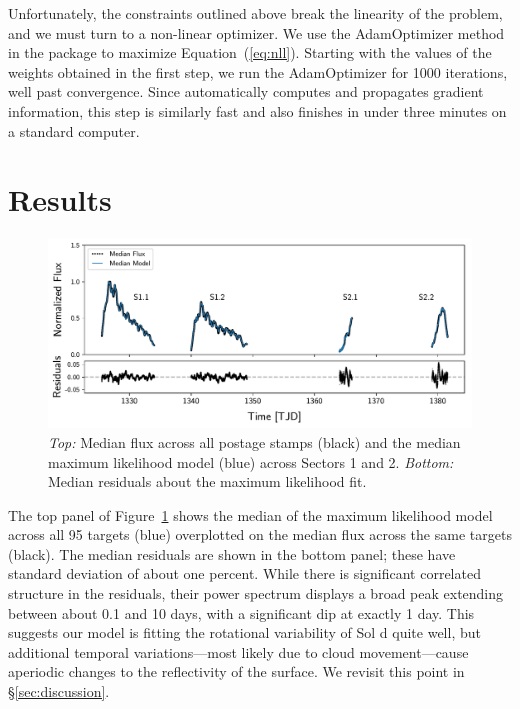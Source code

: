 \documentclass[modern]{aastex62}
\begin{document}
Unfortunately, the constraints outlined above break the linearity 
of the problem, and we must turn to a non-linear optimizer. We use the 
\textsf{AdamOptimizer} method in the \tf package \citep{Abadi2015}
to maximize Equation~(\ref{eq:nll}). Starting with the values of the
weights obtained in the first step, we run the \textsf{AdamOptimizer}
for 1000 iterations, well past convergence. Since \tf automatically
computes and propagates gradient information, this step is similarly fast
and also finishes in under three minutes on a standard computer.

\section{Results}
\label{sec:results}

\begin{figure}[t!]
    \begin{centering}
    \includegraphics[width=\linewidth]{figures/model.pdf}
    \caption{\label{fig:model}
             \emph{Top:} Median flux across all postage stamps (black) and
             the median maximum likelihood model (blue) across Sectors 1 and 2.
             \emph{Bottom:} Median residuals about the maximum likelihood fit.
             }
    \end{centering}
\end{figure}

The top panel of Figure~\ref{fig:model} shows the median of the maximum likelihood model
across all 95 targets (blue) overplotted on the median flux across
the same targets (black). The median residuals are shown in the bottom panel; these have
standard deviation of about one percent. While there is significant correlated
structure in the residuals, their power spectrum displays a broad peak extending 
between about 0.1 and 10 days, with a significant dip at exactly 1 day. This
suggests our model is fitting the rotational variability of Sol d quite well, but
additional temporal variations---most likely due to cloud movement---cause aperiodic
changes to the reflectivity of the surface. We revisit this point in \S\ref{sec:discussion}.
\end{document}
